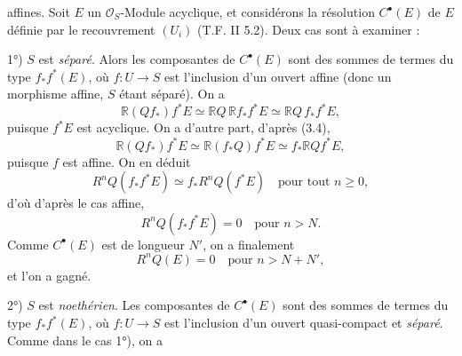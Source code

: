 affines. Soit $E$ un $\mathcal O_S$-Module acyclique, et considérons la résolution $C^\bullet(E)$ de $E$ définie par le recouvrement $(U_i)$ (T.F. II 5.2). Deux cas sont à examiner :

1°) $S$ est \emph{séparé}. Alors les composantes de $C^\bullet(E)$ sont des sommes de termes du type $f_*f^*(E)$, où $f:U\longrightarrow S$ est l'inclusion d'un ouvert affine (donc un morphisme affine, $S$ étant séparé). On a
\[
 \mathbb R(Qf_*)f^*E\simeq \mathbb RQ\,\mathbb Rf_*f^*E\simeq \mathbb RQ\,f_*f^*E,
\]
puisque $f^*E$ est acyclique. On a d'autre part, d'après (3.4),
\[
 \mathbb R(Qf_*)f^*E\simeq \mathbb R(f_*Q)f^*E\simeq f_*\mathbb RQf^*E,
\]
puisque $f$ est affine. On en déduit
\[
 R^nQ(f_*f^*E)\simeq f_*R^nQ(f^*E)
\quad\text{pour tout }n\geq0,
\]
d'où d'après le cas affine,
\[
 R^nQ(f_*f^*E)=0\quad\text{pour }n>N.
\]
Comme $C^\bullet(E)$ est de longueur $N'$, on a finalement
\[
 R^nQ(E)=0\quad\text{pour }n>N+N',
\]
et l'on a gagné.

2°) $S$ est \emph{noethérien}. Les composantes de $C^\bullet(E)$ sont des sommes de termes du type $f_*f^*(E)$, où $f:U\longrightarrow S$ est l'inclusion d'un ouvert quasi-compact et \emph{séparé}. Comme dans le cas 1°), on a
